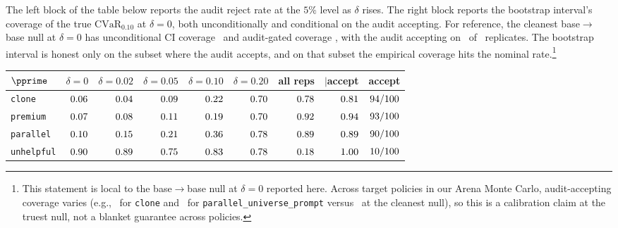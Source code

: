 \documentclass[11pt]{article}
\newcommand{\CVaR}{\mathrm{CVaR}}
\begin{document}
The left block of the table below reports the audit reject rate at the $5\%$ level as $\delta$ rises. The right block reports the bootstrap interval's coverage of the true $\CVaR_{0.10}$ at $\delta = 0$, both unconditionally and conditional on the audit accepting. For reference, the cleanest base$\to$base null at $\delta = 0$ has unconditional CI coverage \mcCovAllBase\ and audit-gated coverage \mcCovAcceptBase, with the audit accepting on \mcNAcceptBase\ of \mcNTotalBase\ replicates. The bootstrap interval is honest only on the subset where the audit accepts, and on that subset the empirical coverage hits the nominal rate.\footnote{This statement is local to the base$\to$base null at $\delta=0$ reported here. Across target policies in our Arena Monte Carlo, audit-accepting coverage varies (e.g., \mcCovAcceptClone\ for \texttt{clone} and \mcCovAcceptParallel\ for \texttt{parallel\_universe\_prompt} versus \mcCovAcceptBase\ at the cleanest null), so this is a calibration claim at the truest null, not a blanket guarantee across policies.}

\begin{table}[H]
\centering
\setlength{\tabcolsep}{4.5pt}
\begin{tabular}{lrrrrr|rrr}
\toprule
$\pprime$ & $\delta=0$ & $\delta=0.02$ & $\delta=0.05$ & $\delta=0.10$ & $\delta=0.20$ & all reps & $\mid$accept & accept \\
\midrule
\texttt{clone}     & $0.06$    & $0.04$    & $0.09$    & $0.22$    & $0.70$    & $0.78$    & $0.81$    & $94/100$ \\
\texttt{premium}   & $0.07$  & $0.08$  & $0.11$  & $0.19$  & $0.70$  & $0.92$  & $0.94$  & $93/100$ \\
\texttt{parallel}  & $0.10$ & $0.15$ & $0.21$ & $0.36$ & $0.78$ & $0.89$ & $0.89$ & $90/100$ \\
\texttt{unhelpful} & $0.90$ & $0.89$ & $0.75$ & $0.83$ & $0.78$ & $0.18$ & $1.00$ & $10/100$ \\
\bottomrule
\end{tabular}
\end{table}
\end{document}
